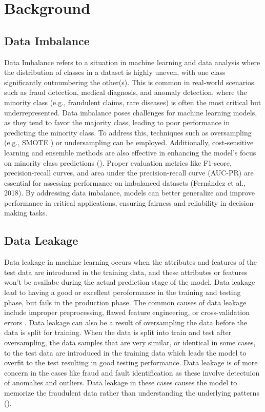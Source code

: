 \documentclass[twoside,11pt]{article}
\begin{document}
\section{Background}
\subsection{Data Imbalance}
Data Imbalance refers to a situation in machine learning and data analysis where the distribution of classes in a dataset is highly uneven, with one class significantly outnumbering the other(s). This is common in real-world scenarios such as fraud detection, medical diagnosis, and anomaly detection, where the minority class (e.g., fraudulent claims, rare diseases) is often the most critical but underrepresented. Data imbalance poses challenges for machine learning models, as they tend to favor the majority class, leading to poor performance in predicting the minority class.
To address this, techniques such as oversampling (e.g., SMOTE \citealp{SMOTESyntheticMinority}) or undersampling can be employed. Additionally, cost-sensitive learning and ensemble methods are also effective in enhancing the model's focus on minority class predictions (\citealp{garcia2009}). Proper evaluation metrics like F1-score, precision-recall curves, and area under the precision-recall curve (AUC-PR) are essential for assessing performance on imbalanced datasets (Fernández et al., 2018).
By addressing data imbalance, models can better generalize and improve performance in critical applications, ensuring fairness and reliability in decision-making tasks.
\subsection{Data Leakage}
Data leakage in machine learning occurs when the attributes and features of the test data are introduced in the training data, and these attributes or features won't be availabe during the actual prediction stage of the model. Data leakage lead to having a good or excellent peroformance in the training and testing phase, but fails in the production phase. The common causes of data leakage include improper preprocessing, flawed feature engineering, or cross-validation errors \cite{Kaufman2012}. Data leakage can also be a result of oversampling the data before the data is split for training. When the data is split into train and test after oversampling, the data samples that are very similar, or identical in some cases, to the test data are introduced in the training data which leads the model to overfit to the test resulting in good testing performance. Data leakage is of more concern in the cases like fraud and fault identification as these involve detectuion of anomalies and outliers. Data leakage in these cases causes the model to memorize the fraudulent data rather than understanding the underlying patterns (\citealp{baesensRobROSERobustApproach2021}).
\end{document}
